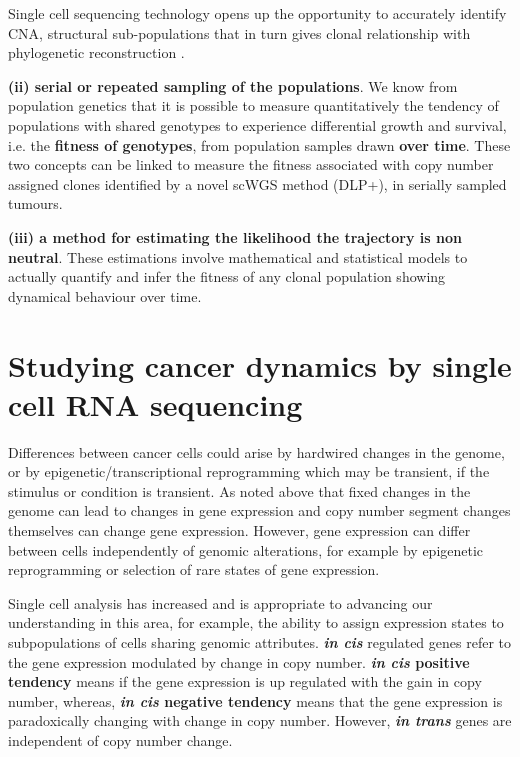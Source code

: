 Single cell sequencing technology opens up the opportunity to accurately identify CNA, structural sub-populations that in turn gives clonal relationship with phylogenetic reconstruction \cite{satas2020scarlet, dorri2020efficient}. 

\textbf{(ii) serial or repeated sampling of the populations}.
We know from population genetics that it is possible to measure quantitatively the tendency of populations with shared genotypes to experience differential growth and survival, i.e. the \textbf{fitness of genotypes}, from population samples drawn \textbf{over time}.
These two concepts can be linked to measure the fitness associated with copy number assigned clones identified by a novel scWGS method (DLP+), in serially sampled tumours.

\textbf{(iii) a method for estimating the likelihood the trajectory is non neutral}.
These estimations involve mathematical and statistical models to actually quantify and infer the fitness of any clonal population showing dynamical behaviour over time.



\section{Studying cancer dynamics by single cell RNA sequencing}

Differences between cancer cells could arise by hardwired changes in the genome, or by epigenetic/transcriptional reprogramming which may be transient, if the stimulus or condition is transient. 
As noted above that fixed changes in the genome can lead to changes in gene expression and copy number segment changes themselves can change gene expression.
However, gene expression can differ between cells independently of genomic alterations, for example by epigenetic reprogramming or selection of rare states of gene expression.

Single cell analysis has increased and is appropriate to advancing our understanding in this area, for example, the ability to assign expression states to subpopulations of cells sharing genomic attributes. \textbf{\textit{in cis}} regulated genes refer to the gene expression modulated by change in copy number. \textbf{{\textit{in cis} positive tendency}} means if the gene expression is up regulated with the gain in copy number, whereas, \textbf{{\textit{in cis} negative tendency}} means that the gene expression is paradoxically changing with change in copy number. However, \textbf{\textit{in trans}} genes are independent of copy number change.

